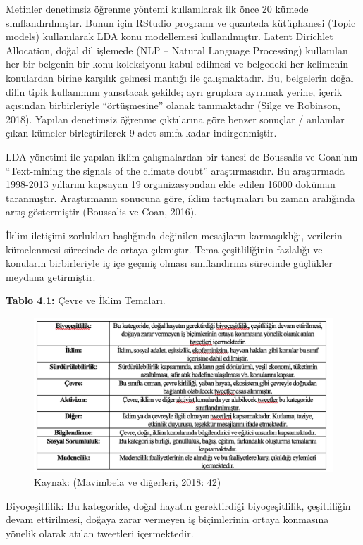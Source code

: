 \documentclass[
]{book}
\begin{document}
Metinler denetimsiz öğrenme yöntemi kullanılarak ilk önce 20 kümede sınıflandırılmıştır. Bunun için RStudio programı ve quanteda kütüphanesi (Topic models) kullanılarak LDA konu modellemesi kullanılmıştır. Latent Dirichlet Allocation, doğal dil işlemede (NLP -- Natural Language Processing) kullanılan her bir belgenin bir konu koleksiyonu kabul edilmesi ve belgedeki her kelimenin konulardan birine karşılık gelmesi mantığı ile çalışmaktadır. Bu, belgelerin doğal dilin tipik kullanımını yansıtacak şekilde; ayrı gruplara ayrılmak yerine, içerik açısından birbirleriyle ``örtüşmesine'' olanak tanımaktadır (Silge ve Robinson, 2018). Yapılan denetimsiz öğrenme çıktılarına göre benzer sonuçlar / anlamlar çıkan kümeler birleştirilerek 9 adet sınıfa kadar indirgenmiştir.

LDA yönetimi ile yapılan iklim çalışmalardan bir tanesi de Boussalis ve Goan'nın ``Text-mining the signals of the climate doubt'' araştırmasıdır. Bu araştırmada 1998-2013 yıllarını kapsayan 19 organizasyondan elde edilen 16000 doküman taranmıştır. Araştırmanın sonucuna göre, iklim tartışmaları bu zaman aralığında artış göstermiştir (Boussalis ve Coan, 2016).

İklim iletişimi zorlukları başlığında değinilen mesajların karmaşıklığı, verilerin kümelenmesi sürecinde de ortaya çıkmıştır. Tema çeşitliliğinin fazlalığı ve konuların birbirleriyle iç içe geçmiş olması sınıflandırma sürecinde güçlükler meydana getirmiştir.

\textbf{Tablo 4.1:} Çevre ve İklim Temaları.

\begin{figure}
\includegraphics[width=0.95\linewidth,height=0.95\textheight]{tablolar-sekiller/tablo-4-1} \caption{Kaynak: (Mavimbela ve diğerleri, 2018: 42)}\label{fig:unnamed-chunk-3}
\end{figure}

Biyoçeşitlilik: Bu kategoride, doğal hayatın gerektirdiği biyoçeşitlilik, çeşitliliğin devam ettirilmesi, doğaya zarar vermeyen iş biçimlerinin ortaya konmasına yönelik olarak atılan tweetleri içermektedir.
\end{document}
